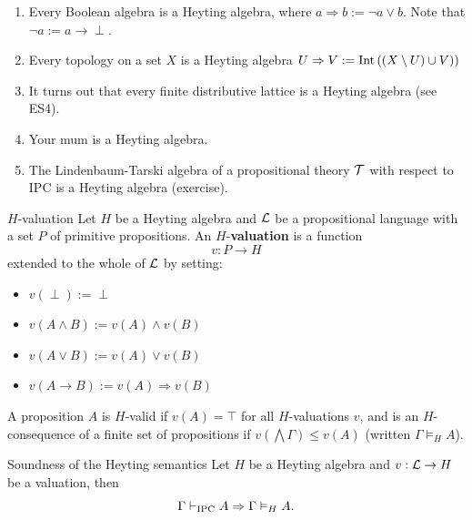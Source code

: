 \documentclass{article}
\numberwithin{thm}{subsection}
\begin{document}
\begin{exs}\hspace{0.1cm}
    \begin{enumerate}
        \item Every Boolean algebra is a Heyting algebra, where $a \Rightarrow b := \neg a \vee b$. Note that $\neg a := a \to \perp$.
        \item Every topology on a set $X$ is a Heyting algebra $U \Rightarrow V := \operatorname{Int}\left( (X \setminus U) \cup V)\right)$
        \item It turns out that every finite distributive lattice is a Heyting algebra (see ES4).
        \item Your mum is a Heyting algebra.
        \item The Lindenbaum-Tarski algebra of a propositional theory $\mathcal{T}$ with respect to IPC is a Heyting algebra (exercise).
    \end{enumerate}
\end{exs}
\begin{fancydefine}{$H$-valuation}
    Let $H$ be a Heyting algebra and $\mathcal{L}$ be a propositional language with a set $P$ of primitive propositions.
    An $H$-\textbf{valuation} is a function \[ v : P \to H \] extended to the whole of $\mathcal{L}$ by setting: \begin{itemize}
        \item $v(\perp) := \perp$
        \item $v(A \wedge B) := v(A) \wedge v(B)$
        \item $v(A \vee B) := v(A) \vee v(B)$
        \item $v(A \to B) := v(A) \Rightarrow v(B)$
    \end{itemize}
    A proposition $A$ is $H$-valid if $v(A) = \top$ for all $H$-valuations $v$, and is an $H$-consequence of a finite set of propositions if $v(\bigwedge \Gamma) \leq v(A)$ (written $\Gamma \vDash_{H} A$).
\end{fancydefine}
\begin{fancylem}{Soundness of the Heyting semantics}
    Let $H$ be a Heyting algebra and $v : \mathcal{L} \to H$ be a valuation, then \[ \Gamma \vdash_{\text{IPC}} A \Rightarrow \Gamma \vDash_{H} A. \]
\end{fancylem}
\end{document}
